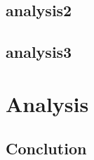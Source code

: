 \documentclass[11pt,onside,a4paper,fleqn]{report}
\begin{document}
\section{analysis2}
 
\section{analysis3}
 
 
 
\chapter{Analysis}
\hspace{0.8cm}
\section{Conclution}                  %
\hspace{0.8cm}
\end{document}
